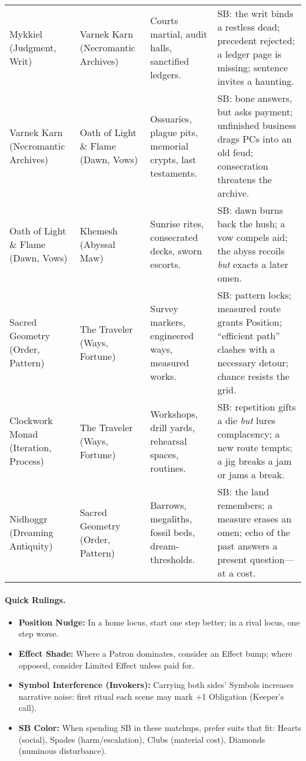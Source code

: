 \begin{longtable}{@{}p{3.3cm}p{3.3cm}p{4.6cm}p{7.2cm}@{}}
Mykkiel (Judgment, Writ) & Varnek Karn (Necromantic Archives) &
Courts martial, audit halls, sanctified ledgers. &
SB: the writ binds a restless dead; precedent rejected; a ledger page is missing; sentence invites a haunting. \\

Varnek Karn (Necromantic Archives) & Oath of Light \& Flame (Dawn, Vows) &
Ossuaries, plague pits, memorial crypts, last testaments. &
SB: bone answers, but asks payment; unfinished business drags PCs into an old feud; consecration threatens the archive. \\

Oath of Light \& Flame (Dawn, Vows) & Khemesh (Abyssal Maw) &
Sunrise rites, consecrated decks, sworn escorts. &
SB: dawn burns back the hush; a vow compels aid; the abyss recoils \emph{but} exacts a later omen. \\

Sacred Geometry (Order, Pattern) & The Traveler (Ways, Fortune) &
Survey markers, engineered ways, measured works. &
SB: pattern locks; measured route grants Position; “efficient path” clashes with a necessary detour; chance resists the grid. \\

Clockwork Monad (Iteration, Process) & The Traveler (Ways, Fortune) &
Workshops, drill yards, rehearsal spaces, routines. &
SB: repetition gifts a die \emph{but} lures complacency; a new route tempts; a jig breaks a jam or jams a break. \\

Nidhoggr (Dreaming Antiquity) & Sacred Geometry (Order, Pattern) &
Barrows, megaliths, fossil beds, dream-thresholds. &
SB: the land remembers; a measure erases an omen; echo of the past answers a present question—at a cost. \\
\end{longtable}

\paragraph{Quick Rulings.}
\begin{itemize}
  \item \textbf{Position Nudge:} In a home locus, start one step better; in a rival locus, one step worse.
  \item \textbf{Effect Shade:} Where a Patron dominates, consider an Effect bump; where opposed, consider Limited Effect unless paid for.
  \item \textbf{Symbol Interference (Invokers):} Carrying both sides’ Symbols increases narrative noise: first ritual each scene may mark +1 Obligation (Keeper’s call).
  \item \textbf{SB Color:} When spending SB in these matchups, prefer suits that fit: Hearts (social), Spades (harm/escalation), Clubs (material cost), Diamonds (numinous disturbance).
\end{itemize}

